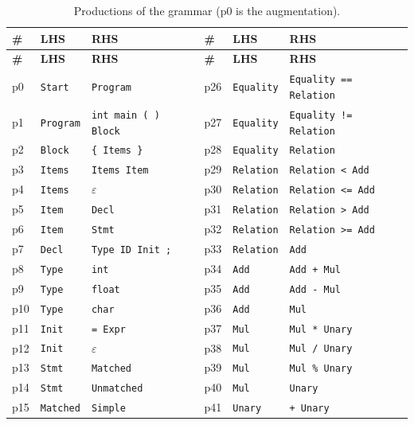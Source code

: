 \documentclass[11pt,letterpaper]{article}
\begin{document}
{\small
\setlength{\tabcolsep}{4pt}
\begin{longtable}{@{}l l l | l l l@{}}
\caption{Productions of the grammar (p0 is the augmentation).}\label{tab:prods}\\
\toprule
\textbf{\#} & \textbf{LHS} & \textbf{RHS} & \textbf{\#} & \textbf{LHS} & \textbf{RHS}\\
\midrule
\endfirsthead
\toprule
\textbf{\#} & \textbf{LHS} & \textbf{RHS} & \textbf{\#} & \textbf{LHS} & \textbf{RHS}\\
\midrule
\endhead
p0 & \texttt{Start} & \texttt{Program} & p26 & \texttt{Equality} & \texttt{Equality == Relation}\\
p1 & \texttt{Program} & \texttt{int main ( ) Block} & p27 & \texttt{Equality} & \texttt{Equality != Relation}\\
p2 & \texttt{Block} & \texttt{\{ Items \}} & p28 & \texttt{Equality} & \texttt{Relation}\\
p3 & \texttt{Items} & \texttt{Items Item} & p29 & \texttt{Relation} & \texttt{Relation \textless{} Add}\\
p4 & \texttt{Items} & \texttt{$\varepsilon$} & p30 & \texttt{Relation} & \texttt{Relation \textless{}= Add}\\
p5 & \texttt{Item} & \texttt{Decl} & p31 & \texttt{Relation} & \texttt{Relation \textgreater{} Add}\\
p6 & \texttt{Item} & \texttt{Stmt} & p32 & \texttt{Relation} & \texttt{Relation \textgreater{}= Add}\\
p7 & \texttt{Decl} & \texttt{Type ID Init ;} & p33 & \texttt{Relation} & \texttt{Add}\\
p8 & \texttt{Type} & \texttt{int} & p34 & \texttt{Add} & \texttt{Add + Mul}\\
p9 & \texttt{Type} & \texttt{float} & p35 & \texttt{Add} & \texttt{Add - Mul}\\
p10 & \texttt{Type} & \texttt{char} & p36 & \texttt{Add} & \texttt{Mul}\\
p11 & \texttt{Init} & \texttt{= Expr} & p37 & \texttt{Mul} & \texttt{Mul * Unary}\\
p12 & \texttt{Init} & \texttt{$\varepsilon$} & p38 & \texttt{Mul} & \texttt{Mul / Unary}\\
p13 & \texttt{Stmt} & \texttt{Matched} & p39 & \texttt{Mul} & \texttt{Mul \% Unary}\\
p14 & \texttt{Stmt} & \texttt{Unmatched} & p40 & \texttt{Mul} & \texttt{Unary}\\
p15 & \texttt{Matched} & \texttt{Simple} & p41 & \texttt{Unary} & \texttt{+ Unary}\\

\end{longtable}}
\end{document}
